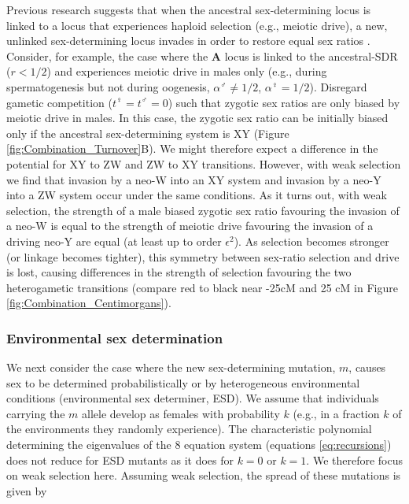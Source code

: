 \documentclass[12pt]{article}
\begin{document}
Previous research suggests that when the ancestral sex-determining locus is linked to a locus that experiences haploid selection (e.g., meiotic drive), a new, unlinked sex-determining locus invades in order to restore equal sex ratios \citep{Kozielska:2010vm}. 
Consider, for example, the case where the \textbf{A} locus is linked to the ancestral-SDR ($r<1/2$) and experiences meiotic drive in males only (e.g., during spermatogenesis but not during oogenesis, $\alpha^\male \neq 1/2$, $\alpha^\female=1/2$). 
Disregard gametic competition ($t^\female=t^\male=0$) such that zygotic sex ratios are only biased by meiotic drive in males. 
In this case, the zygotic sex ratio can be initially biased only if the ancestral sex-determining system is XY (Figure \ref{fig:Combination_Turnover}B). 
We might therefore expect a difference in the potential for XY to ZW and ZW to XY transitions. 
However, with weak selection we find that invasion by a neo-W into an XY system and invasion by a neo-Y into a ZW system occur under the same conditions. 
As it turns out, with weak selection, the strength of a male biased zygotic sex ratio favouring the invasion of a neo-W is equal to the strength of meiotic drive favouring the invasion of a driving neo-Y are equal (at least up to order $\epsilon^2$).
As selection becomes stronger (or linkage becomes tighter), this symmetry between sex-ratio selection and drive is lost, causing differences in the strength of selection favouring the two heterogametic transitions (compare red to black near -25cM and 25 cM in Figure \ref{fig:Combination_Centimorgans}). 


\subsubsection*{Environmental sex determination}

We next consider the case where the new sex-determining mutation, $m$, causes sex to be determined probabilistically or by heterogeneous environmental conditions (environmental sex determiner, ESD). 
We assume that individuals carrying the $m$ allele develop as females with probability $k$ (e.g., in a fraction $k$ of the environments they randomly experience).
The characteristic polynomial determining the eigenvalues of the 8 equation system (equations \ref{eq:recursions}) does not reduce for ESD mutants as it does for $k=0$ or $k=1$. 
We therefore focus on weak selection here. 
Assuming weak selection, the spread of these mutations is given by 
\end{document}
